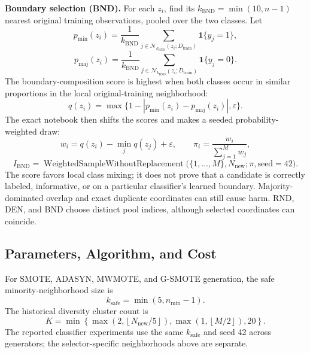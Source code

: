 \documentclass[pdflatex]{sn-jnl}
\begin{document}
\textbf{Boundary selection (BND).} For each \(z_i\), find its \(k_{\mathrm{BND}}=\min(10,n-1)\) nearest original training observations, pooled over the two classes. Let
\begin{equation}\label{eq:9}
p_{\min}(z_i)=\frac{1}{k_{\mathrm{BND}}}
\sum_{j\in\mathcal{N}_{k_{\mathrm{BND}}}(z_i;D_{\mathrm{train}})}
\mathbf{1}\{y_j=1\},
\end{equation}
\begin{equation}\label{eq:10}
p_{\mathrm{maj}}(z_i)=\frac{1}{k_{\mathrm{BND}}}
\sum_{j\in\mathcal{N}_{k_{\mathrm{BND}}}(z_i;D_{\mathrm{train}})}
\mathbf{1}\{y_j=0\}.
\end{equation}
The boundary-composition score is highest when both classes occur in similar proportions in the local original-training neighborhood:
\begin{equation}\label{eq:11}
q(z_i)=\max\{1-|p_{\min}(z_i)-p_{\mathrm{maj}}(z_i)|,\varepsilon\}.
\end{equation}
The exact notebook then shifts the scores and makes a seeded probability-weighted draw:
\begin{equation}\label{eq:12}
w_i=q(z_i)-\min_j q(z_j)+\varepsilon,\qquad
\pi_i=\frac{w_i}{\sum_{j=1}^{M}w_j},
\end{equation}
\begin{equation}\label{eq:13}
I_{\mathrm{BND}}=
\operatorname{WeightedSampleWithoutReplacement}
\bigl(\{1,\ldots,M\},N_{\mathrm{new}};\pi,\mathrm{seed}=42\bigr).
\end{equation}
The score favors local class mixing; it does not prove that a candidate is correctly labeled, informative, or on a particular classifier's learned boundary. Majority-dominated overlap and exact duplicate coordinates can still cause harm. RND, DEN, and BND choose distinct pool indices, although selected coordinates can coincide.

\subsection{Parameters, Algorithm, and Cost}

For SMOTE, ADASYN, MWMOTE, and G-SMOTE generation, the safe minority-neighborhood size is
\begin{equation}\label{eq:14}
k_{\mathrm{safe}}=\min(5,n_{\min}-1).
\end{equation}
The historical diversity cluster count is
\begin{equation}\label{eq:15}
K=\min\left\{\max\!\left(2,\left\lfloor N_{\mathrm{new}}/5\right\rfloor\right),
\max\!\left(1,\left\lfloor M/2\right\rfloor\right),20\right\}.
\end{equation}
The reported classifier experiments use the same \(k_{\mathrm{safe}}\) and seed 42 across generators; the selector-specific neighborhoods above are separate.
\end{document}
